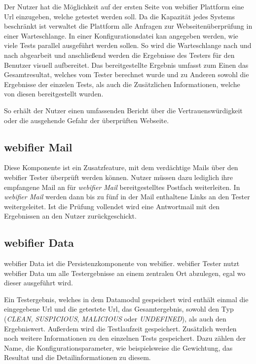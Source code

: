 Der Nutzer hat die Möglichkeit auf der ersten Seite von webifier Plattform eine Url einzugeben, welche getestet werden soll. Da die Kapazität jedes Systems beschränkt ist verwaltet die Plattform alle Anfragen zur Webseitenüberprüfung in einer Warteschlange. In einer Konfigurationsdatei kan angegeben werden, wie viele Tests parallel ausgeführt werden sollen. So wird die Warteschlange nach und nach abgearbeit und anschließend werden die Ergebnisse des Testers für den Benutzer visuell aufbereitet. Das bereitgestellte Ergebnis umfasst zum Einen das Gesamtresultat, welches vom Tester berechnet wurde und zu Anderen sowohl die Ergebnisse der einzelen Tests, als auch die Zusätzlichen Informationen, welche von diesen bereitgestellt wurden.

So erhält der Nutzer einen umfassenden Bericht über die Vertrauenswürdigkeit oder die ausgehende Gefahr der überprüften Webseite.

\subsection{webifier Mail}
Diese Komponente ist ein Zusatzfeature, mit dem verdächtige Mails über den webifier Tester überprüft werden können. Nutzer müssen dazu lediglich ihre empfangene Mail an für \textit{webifier Mail} bereitgestelltes Postfach weiterleiten. In \textit{webifier Mail} werden dann bis zu fünf in der Mail enthaltene Links an den Tester weitergeleitet. Ist die Prüfung vollendet wird eine Antwortmail mit den Ergebnissen an den Nutzer zurückgeschickt.

\subsection{webifier Data}
\label{sec:konzept-data}

webifier Data ist die Persistenzkomponente von webifier. webifier Tester nutzt webifier Data um alle Testergebnisse an einem zentralen Ort abzulegen, egal wo dieser ausgeführt wird.

Ein Testergebnis, welches in dem Datamodul gespeichert wird enthält einmal die eingegebene Url und die getestete Url, das Gesamtergebnis, sowohl den Typ (\textit{CLEAN}, \textit{SUSPICIOUS}, \textit{MALICIOUS} oder \textit{UNDEFINED}), als auch den Ergebniswert. Außerdem wird die Testlaufzeit gespeichert. Zusätzlich werden noch weitere Informationen zu den einzelnen Tests gespeichert. Dazu zählen der Name, die Konfigurationsparameter, wie beispielsweise die Gewichtung, das Resultat und die Detailinformationen zu diesem.

